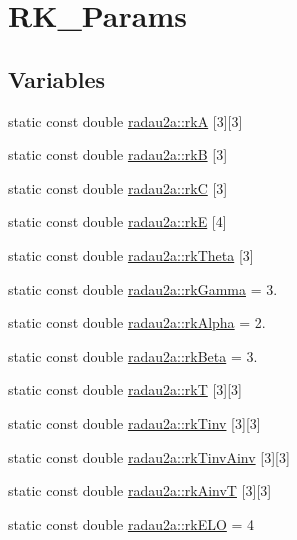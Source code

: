 \hypertarget{group__Parameters}{}\section{R\+K\+\_\+\+Params}
\label{group__Parameters}
\subsection*{Variables}
\begin{DoxyCompactItemize}
\item 
static const double \hyperlink{group__Parameters_ga37314d1d93d3f053f469c40c5d42a43e}{radau2a\+::rkA} \mbox{[}3\mbox{]}\mbox{[}3\mbox{]}
\item 
static const double \hyperlink{group__Parameters_gaefb80779066572ac8b1e549cf1293de1}{radau2a\+::rkB} \mbox{[}3\mbox{]}
\item 
static const double \hyperlink{group__Parameters_ga7e8fecc1a981ceff1796a595b0ef5b4a}{radau2a\+::rkC} \mbox{[}3\mbox{]}
\item 
static const double \hyperlink{group__Parameters_gae792ec3177ed6d29903669bcde591f94}{radau2a\+::rkE} \mbox{[}4\mbox{]}
\item 
static const double \hyperlink{group__Parameters_ga905a164e07054850af60562b36b1aa9f}{radau2a\+::rk\+Theta} \mbox{[}3\mbox{]}
\item 
static const double \hyperlink{group__Parameters_ga188fa0b309eb2826403d911684735824}{radau2a\+::rk\+Gamma} = 3.
\item 
static const double \hyperlink{group__Parameters_gab60c47377f4985db23effa46e2239c24}{radau2a\+::rk\+Alpha} = 2.
\item 
static const double \hyperlink{group__Parameters_ga9a1ddba0cd8b29630b2c005af061c656}{radau2a\+::rk\+Beta} = 3.
\item 
static const double \hyperlink{group__Parameters_gac217dadb5a83f73958dba436ae4fa415}{radau2a\+::rkT} \mbox{[}3\mbox{]}\mbox{[}3\mbox{]}
\item 
static const double \hyperlink{group__Parameters_ga967c2bc749d9b8cda1585bf4ee50b1c1}{radau2a\+::rk\+Tinv} \mbox{[}3\mbox{]}\mbox{[}3\mbox{]}
\item 
static const double \hyperlink{group__Parameters_ga048232e984719eb1fed3f8ba7fb4c25b}{radau2a\+::rk\+Tinv\+Ainv} \mbox{[}3\mbox{]}\mbox{[}3\mbox{]}
\item 
static const double \hyperlink{group__Parameters_gaf7c73eb3be684541be92d125fef651bc}{radau2a\+::rk\+AinvT} \mbox{[}3\mbox{]}\mbox{[}3\mbox{]}
\item 
static const double \hyperlink{group__Parameters_ga8f0bf108626219e500ffe0b78c01b246}{radau2a\+::rk\+E\+LO} = 4
\end{DoxyCompactItemize}


